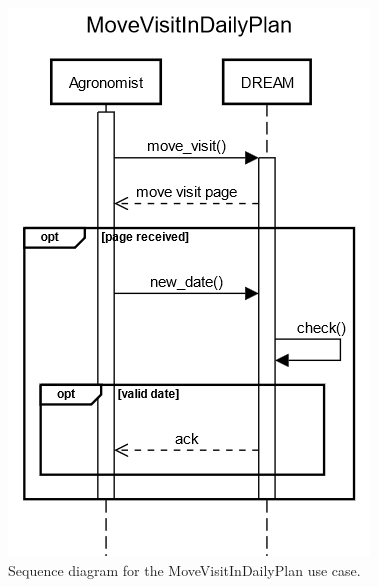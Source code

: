 \documentclass{article}
\begin{document}
\begin{figure}[H]
    \centering
    \includegraphics[scale=0.75]{sequence_diagrams/MoveVisitInDailyPlan.png}
    \caption{Sequence diagram for the MoveVisitInDailyPlan use case.}
\end{figure}
\newpage
\end{document}
